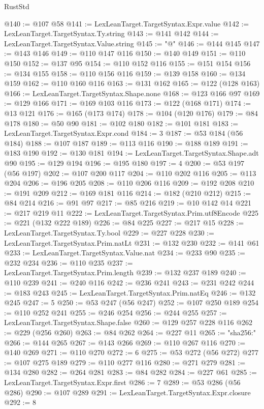 \begin{lexlean}{RustStd}
\begin{coremodule}
@140 := @107 @58
@141 := LexLeanTarget.TargetSyntax.Expr.value
@142 := LexLeanTarget.TargetSyntax.Ty.string
@143 := @141 @142
@144 := LexLeanTarget.TargetSyntax.Value.string
@145 := "@"
@146 := @144 @145
@147 := @143 @146
@149 := @110 @147 @116
@150 := @140 @149
@151 := @110 @150
@152 := @137 @95
@154 := @110 @152 @116
@155 := @151 @154
@156 := @134 @155
@158 := @110 @156 @116
@159 := @139 @158
@160 := @134 @159
@162 := @110 @160 @116
@163 := @131 @162
@165 := @122 (@128 @163)
@166 := LexLeanTarget.TargetSyntax.Shape.none
@168 := @123 @166 @97
@169 := @129 @166
@171 := @169 @103 @116
@173 := @122 (@168 @171)
@174 := @13 @121
@176 := @165 (@173 @174)
@178 := @104 (@120 @176)
@179 := @84 @178
@180 := @50 @90
@181 := @102 @180
@182 := @101 @181
@183 := LexLeanTarget.TargetSyntax.Expr.cond
@184 := 3
@187 := @53 @184 (@56 @184)
@188 := @107 @187
@189 := @113 @116
@190 := @188 @189
@191 := @183 @190
@192 := @130 @181
@194 := LexLeanTarget.TargetSyntax.Shape.adt @90
@195 := @129 @194
@196 := @195 @180
@197 := 4
@200 := @53 @197 (@56 @197)
@202 := @107 @200 @117
@204 := @110 @202 @116
@205 := @113 @204
@206 := @196 @205
@208 := @110 @206 @116
@209 := @192 @208
@210 := @191 @209
@212 := @169 @181 @116
@214 := @182 (@210 @212)
@215 := @84 @214
@216 := @91 @97
@217 := @85 @216
@219 := @10 @142 @14
@221 := @217 @219 @11
@222 := LexLeanTarget.TargetSyntax.Prim.utf8Encode
@225 := @221 (@132 @222 @189)
@226 := @84 @225
@227 := @217 @15
@228 := LexLeanTarget.TargetSyntax.Ty.bool
@229 := @227 @228
@230 := LexLeanTarget.TargetSyntax.Prim.natLt
@231 := @132 @230
@232 := @141 @61
@233 := LexLeanTarget.TargetSyntax.Value.nat
@234 := @233 @90
@235 := @232 @234
@236 := @110 @235
@237 := LexLeanTarget.TargetSyntax.Prim.length
@239 := @132 @237 @189
@240 := @110 @239
@241 := @240 @116
@242 := @236 @241
@243 := @231 @242
@244 := @183 @243
@245 := LexLeanTarget.TargetSyntax.Prim.natEq
@246 := @132 @245
@247 := 5
@250 := @53 @247 (@56 @247)
@252 := @107 @250 @189
@254 := @110 @252 @241
@255 := @246 @254
@256 := @244 @255
@257 := LexLeanTarget.TargetSyntax.Shape.false
@260 := @129 @257 @228 @116
@262 := @229 (@256 @260)
@263 := @84 @262
@264 := @227 @11
@265 := "sha256:"
@266 := @144 @265
@267 := @143 @266
@269 := @110 @267 @116
@270 := @140 @269
@271 := @110 @270
@272 := 6
@275 := @53 @272 (@56 @272)
@277 := @107 @275 @189
@279 := @110 @277 @116
@280 := @271 @279
@281 := @134 @280
@282 := @264 @281
@283 := @84 @282
@284 := @227 @61
@285 := LexLeanTarget.TargetSyntax.Expr.first
@286 := 7
@289 := @53 @286 (@56 @286)
@290 := @107 @289
@291 := LexLeanTarget.TargetSyntax.Expr.closure
@292 := 8

\end{coremodule}
\end{lexlean}
